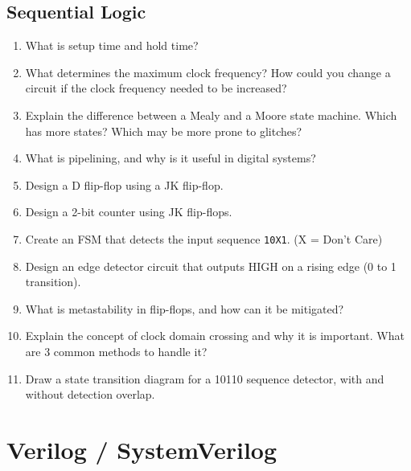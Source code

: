 \documentclass[11pt]{article}
\begin{document}
\subsection{Sequential Logic}
\begin{enumerate}
    \item What is setup time and hold time?
    \item What determines the maximum clock frequency? How could you change a
    circuit if the clock frequency needed to be increased?
    \item Explain the difference between a Mealy and a Moore state machine.
    Which has more states? Which may be more prone to glitches?
    \item What is pipelining, and why is it useful in digital systems?
    \item Design a D flip-flop using a JK flip-flop.
    \item Design a 2-bit counter using JK flip-flops.
    \item Create an FSM that detects the input sequence \texttt{10X1}. (X = Don't Care)
    \item Design an edge detector circuit that outputs HIGH on a rising edge (0 to 1
    transition).
    \item What is metastability in flip-flops, and how can it be mitigated?
    \item Explain the concept of clock domain crossing and why it is important.
    What are 3 common methods to handle it?
    \item Draw a state transition diagram for a 10110 sequence detector, with
    and without detection overlap.
\end{enumerate}

\section{Verilog / SystemVerilog}
\end{document}
